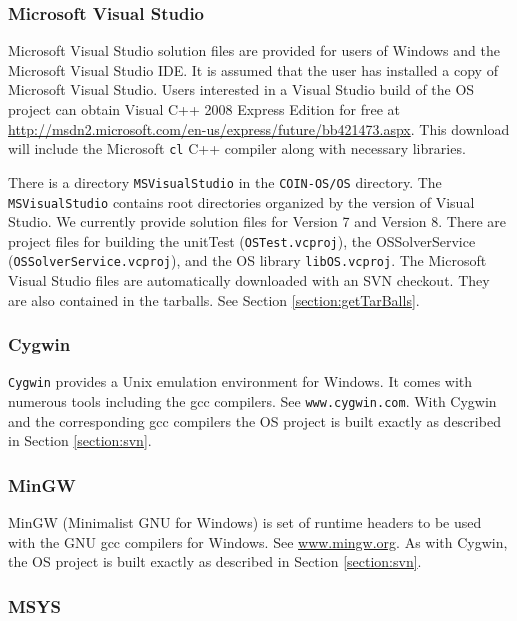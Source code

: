 \documentclass[11pt]{article}
\renewcommand{\_}{{\char"5F}}
\renewcommand{\{}{{\char"7B}}
\renewcommand{\}}{{\char"7D}}
\renewcommand{\^}{{\char"0D}}
\renewcommand{\'}{{\char"0D}}
\begin{document}
\subsubsection{Microsoft Visual Studio}

Microsoft Visual Studio solution files are provided for users of Windows and the Microsoft Visual Studio IDE.     It is assumed that the user has installed a copy of Microsoft Visual Studio.  Users interested in a Visual Studio build of the OS project can obtain Visual C++ 2008 Express Edition for free at \url{http://msdn2.microsoft.com/en-us/express/future/bb421473.aspx}.  This download will include the Microsoft {\tt cl}  C++ compiler along with necessary libraries. 




There is a directory {\tt MSVisualStudio} in the {\tt COIN-OS/OS}  directory.  The {\tt MSVisualStudio} contains root directories organized by the version of Visual Studio.  We currently provide solution files  for Version 7 and Version 8.  There are project files for building the unitTest ({\tt OSTest.vcproj}),  the OSSolverService ({\tt OSSolverService.vcproj}), and the OS library {\tt libOS.vcproj}.   The Microsoft Visual Studio files are automatically downloaded with an SVN checkout. They are also contained in the tarballs.  See Section \ref{section:getTarBalls}.    



\subsubsection{Cygwin}

{\tt Cygwin} provides a Unix emulation environment for Windows. It comes with numerous tools including the gcc compilers. See {\tt www.cygwin.com}.   With Cygwin and the corresponding gcc compilers the OS project is  built exactly as described in Section \ref{section:svn}.

\subsubsection{MinGW} 



MinGW (Minimalist GNU for Windows) is set of runtime headers to be used with the GNU gcc compilers for Windows.  See \url{www.mingw.org}. As with Cygwin, the OS project is  built exactly as described in Section \ref{section:svn}.

\subsubsection{MSYS}
\end{document}
